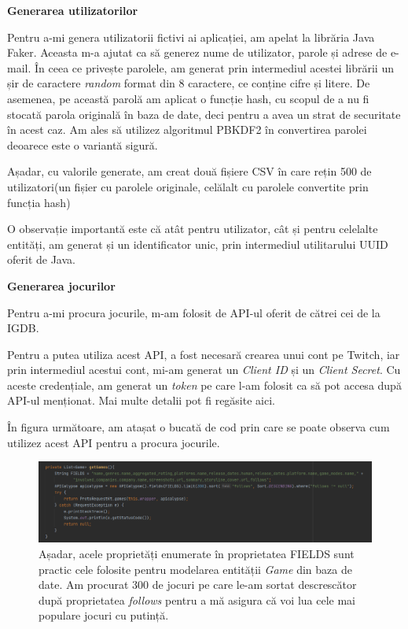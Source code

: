 \documentclass[12pt,a4paper]{report}
\begin{document}
\bigskip
\textbf{Generarea utilizatorilor}
\bigskip

Pentru a-mi genera utilizatorii fictivi ai aplicației, am apelat la librăria Java Faker. Aceasta m-a ajutat ca să generez nume de utilizator, parole și adrese de e-mail. În ceea ce privește parolele, am generat prin intermediul acestei librării un șir de caractere \emph{random} format din 8 caractere, ce conține cifre și litere. De asemenea, pe această parolă am aplicat o funcție hash, cu scopul de a nu fi stocată parola originală în baza de date, deci pentru a avea un strat de securitate în acest caz. Am ales să utilizez algoritmul PBKDF2 în convertirea parolei deoarece este o variantă sigură. \cite{15}

Așadar, cu valorile generate, am creat două fișiere CSV în care rețin 500 de utilizatori(un fișier cu parolele originale, celălalt cu parolele convertite prin funcția hash)

O observație importantă este că atât pentru utilizator, cât și pentru celelalte entități, am generat și un identificator unic, prin intermediul utilitarului UUID oferit de Java.

\bigskip
\textbf{Generarea jocurilor}
\bigskip

Pentru a-mi procura jocurile, m-am folosit de API-ul oferit de cătrei cei de la IGDB.

Pentru a putea utiliza acest API, a fost necesară crearea unui cont pe Twitch, iar prin intermediul acestui cont, mi-am generat un \emph{Client ID} și un \emph{Client Secret}. Cu aceste credențiale, am generat un \emph{token} pe care l-am folosit ca să pot accesa după API-ul menționat. Mai multe detalii pot fi regăsite aici. \cite{16}

În figura următoare, am atașat o bucată de cod prin care se poate observa cum utilizez acest API pentru a procura jocurile.

\begin{figure}[H]
\centering
\caption{}
\includegraphics[scale = 0.6]{exemplu_10_games}
\caption*{Așadar, acele proprietăți enumerate în proprietatea FIELDS sunt practic cele folosite pentru modelarea entității \emph{Game} din baza de date. Am procurat 300 de jocuri pe care le-am sortat descrescător după proprietatea \emph{follows} pentru a mă asigura că voi lua cele mai populare jocuri cu putință. }
\end{figure}
\end{document}
